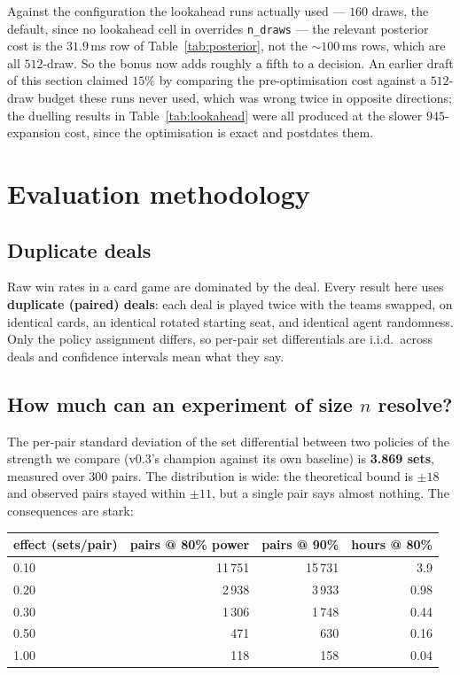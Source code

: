 \documentclass[11pt,a4paper]{article}
\begin{document}
Against the configuration the lookahead runs actually used --- $160$ draws, the
 default, since no lookahead cell in
 overrides \texttt{n\_draws} --- the relevant
posterior cost is the $31.9$\,ms row of Table~\ref{tab:posterior}, not the
$\sim\!100$\,ms rows, which are all $512$-draw. So the bonus now adds roughly a
fifth to a decision. An earlier draft of this section claimed $15\%$ by comparing
the pre-optimisation cost against a $512$-draw budget these runs never used,
which was wrong twice in opposite directions; the duelling results in
Table~\ref{tab:lookahead} were all produced at the slower $945$-expansion cost,
since the optimisation is exact and postdates them.

\section{Evaluation methodology}
\label{sec:eval}

\subsection{Duplicate deals}

Raw win rates in a card game are dominated by the deal. Every result here uses
\textbf{duplicate (paired) deals}: each deal is played twice with the teams
swapped, on identical cards, an identical rotated starting seat, and identical
agent randomness. Only the policy assignment differs, so per-pair set
differentials are i.i.d.\ across deals and confidence intervals mean what they
say.

\subsection{How much can an experiment of size \texorpdfstring{$n$}{n} resolve?}

The per-pair standard deviation of the set differential between two policies of
the strength we compare (v0.3's champion against its own baseline) is
\textbf{3.869 sets}, measured over 300 pairs. The distribution is wide: the
theoretical bound is $\pm 18$ and observed pairs stayed within $\pm 11$, but a
single pair says almost nothing. The consequences are stark:

\begin{center}
\small
\begin{tabular}{lrrr}
\toprule
effect (sets/pair) & pairs @ 80\% power & pairs @ 90\% & hours @ 80\% \\
\midrule
0.10 & 11\,751 & 15\,731 & 3.9 \\
0.20 & 2\,938 & 3\,933 & 0.98 \\
0.30 & 1\,306 & 1\,748 & 0.44 \\
0.50 & 471 & 630 & 0.16 \\
1.00 & 118 & 158 & 0.04 \\
\bottomrule
\end{tabular}
\end{center}
\end{document}

